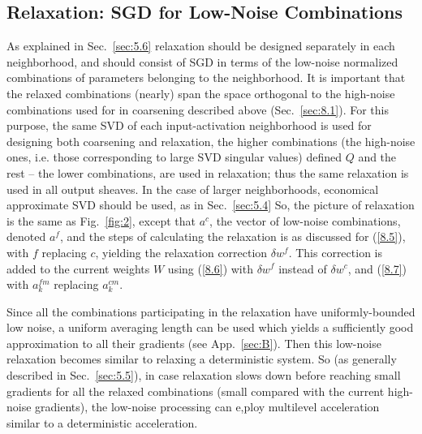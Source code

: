 \documentclass{article} %
\begin{document}
\subsection{Relaxation: SGD for Low-Noise Combinations}
\label{sec:sgd_relaxation}
As explained in Sec.~\ref{sec:5.6} relaxation should be designed separately in each neighborhood, and should consist of SGD in terms of the low-noise normalized combinations of parameters belonging to the neighborhood. It is important that the relaxed combinations (nearly) span the space orthogonal to the high-noise combinations used for in coarsening described above (Sec.~\ref{sec:8.1}). For this purpose, the same SVD of each input-activation neighborhood is used for designing both coarsening and relaxation, the higher combinations (the high-noise ones, i.e. those corresponding to large SVD singular values) defined $Q$ and the rest -- the lower combinations, are used in relaxation; thus the same relaxation is used in all output sheaves. In the case of larger neighborhoods, economical approximate SVD should be used, as in Sec.~\ref{sec:5.4} So, the picture of relaxation is the same as Fig.~\ref{fig:2}, except that $a^c$, the vector of low-noise combinations, denoted $a^f$, and the steps of calculating the relaxation is as discussed for (\ref{8.5}), with $f$ replacing $c$, yielding the relaxation correction $\delta w^f$. This correction is added to the current weights $W$ using (\ref{8.6}) with $\delta w^f$ instead of $\delta w^c$, and (\ref{8.7}) with $a^{fm}_k$ replacing $a^{cm}_k$.

Since all the combinations participating in the relaxation have uniformly-bounded low noise, a uniform averaging length can be used which yields a sufficiently good approximation to all their gradients (see App.~\ref{sec:B}). Then this low-noise relaxation becomes similar to relaxing a deterministic system. So (as generally described in Sec.~\ref{sec:5.5}), in case relaxation slows down before reaching small gradients for all the relaxed combinations (small compared with the current high-noise gradients), the low-noise processing can e,ploy multilevel acceleration similar to a deterministic acceleration.
\end{document}

